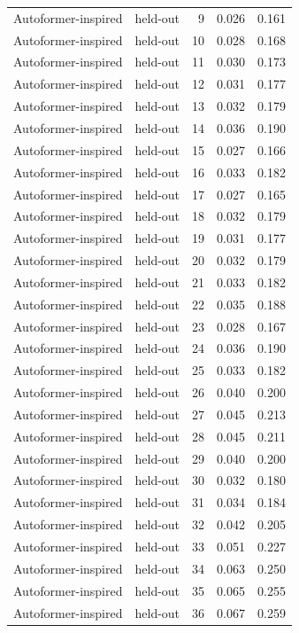 \begin{tabular}{llrrr}
Autoformer-inspired & held-out & 9 & 0.026 & 0.161 \\
Autoformer-inspired & held-out & 10 & 0.028 & 0.168 \\
Autoformer-inspired & held-out & 11 & 0.030 & 0.173 \\
Autoformer-inspired & held-out & 12 & 0.031 & 0.177 \\
Autoformer-inspired & held-out & 13 & 0.032 & 0.179 \\
Autoformer-inspired & held-out & 14 & 0.036 & 0.190 \\
Autoformer-inspired & held-out & 15 & 0.027 & 0.166 \\
Autoformer-inspired & held-out & 16 & 0.033 & 0.182 \\
Autoformer-inspired & held-out & 17 & 0.027 & 0.165 \\
Autoformer-inspired & held-out & 18 & 0.032 & 0.179 \\
Autoformer-inspired & held-out & 19 & 0.031 & 0.177 \\
Autoformer-inspired & held-out & 20 & 0.032 & 0.179 \\
Autoformer-inspired & held-out & 21 & 0.033 & 0.182 \\
Autoformer-inspired & held-out & 22 & 0.035 & 0.188 \\
Autoformer-inspired & held-out & 23 & 0.028 & 0.167 \\
Autoformer-inspired & held-out & 24 & 0.036 & 0.190 \\
Autoformer-inspired & held-out & 25 & 0.033 & 0.182 \\
Autoformer-inspired & held-out & 26 & 0.040 & 0.200 \\
Autoformer-inspired & held-out & 27 & 0.045 & 0.213 \\
Autoformer-inspired & held-out & 28 & 0.045 & 0.211 \\
Autoformer-inspired & held-out & 29 & 0.040 & 0.200 \\
Autoformer-inspired & held-out & 30 & 0.032 & 0.180 \\
Autoformer-inspired & held-out & 31 & 0.034 & 0.184 \\
Autoformer-inspired & held-out & 32 & 0.042 & 0.205 \\
Autoformer-inspired & held-out & 33 & 0.051 & 0.227 \\
Autoformer-inspired & held-out & 34 & 0.063 & 0.250 \\
Autoformer-inspired & held-out & 35 & 0.065 & 0.255 \\
Autoformer-inspired & held-out & 36 & 0.067 & 0.259 \\

\end{tabular}
